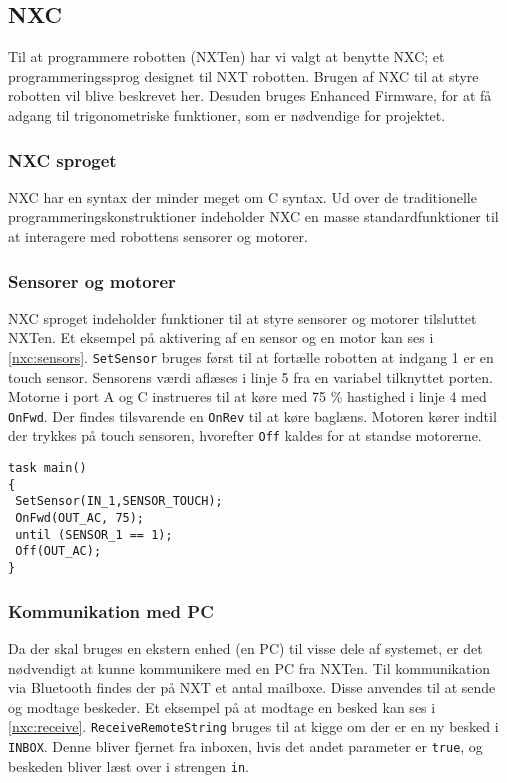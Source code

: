 \subsection{NXC}\label{nxc}
Til at programmere robotten (NXTen) har vi valgt at benytte NXC; et programmeringssprog designet til NXT robotten. 
Brugen af NXC til at styre robotten vil blive beskrevet her.\cite{NXC}
Desuden bruges Enhanced Firmware, for at få adgang til trigonometriske funktioner, som er nødvendige for projektet.\cite{enhanced_firmware}

\subsubsection{NXC sproget}
NXC har en syntax der minder meget om C syntax. 
Ud over de traditionelle programmeringskonstruktioner indeholder NXC en masse standardfunktioner til at interagere med robottens sensorer og motorer.

\subsubsection{Sensorer og motorer}
NXC sproget indeholder funktioner til at styre sensorer og motorer tilsluttet NXTen.
Et eksempel på aktivering af en sensor og en motor kan ses i \cref{nxc:sensors}.
\lstinline[style=c]!SetSensor! bruges først til at fortælle robotten at indgang 1 er en touch sensor. 
Sensorens værdi aflæses i linje 5 fra en variabel tilknyttet porten.
Motorne i port A og C instrueres til at køre med 75 \% hastighed i linje 4 med \lstinline[style=c]!OnFwd!.  
Der findes tilsvarende en \lstinline[style=c]!OnRev! til at køre baglæns.
Motoren kører indtil der trykkes på touch sensoren, hvorefter \lstinline[style=c]!Off! kaldes for at standse motorerne.

\begin{lstlisting}[style=c,label=nxc:sensors, caption={Brug af motorer og sensorer.}]
task main()
{
 SetSensor(IN_1,SENSOR_TOUCH);
 OnFwd(OUT_AC, 75);
 until (SENSOR_1 == 1);
 Off(OUT_AC);
}
\end{lstlisting}

\subsubsection{Kommunikation med PC}
Da der skal bruges en ekstern enhed (en PC) til visse dele af systemet, er det nødvendigt at kunne kommunikere med en PC fra NXTen.
Til kommunikation via Bluetooth findes der på NXT et antal mailboxe.
Disse anvendes til at sende og modtage beskeder.
Et eksempel på at modtage en besked kan ses i \cref{nxc:receive}.
\lstinline[style=c]|ReceiveRemoteString| bruges til at kigge om der er en ny besked i \lstinline[style=c]!INBOX!.
Denne bliver fjernet fra inboxen, hvis det andet parameter er \lstinline[style=c]|true|, og beskeden bliver læst over i strengen \lstinline[style=c]|in|.

